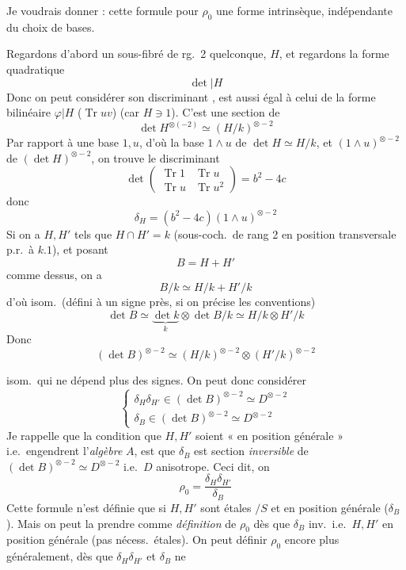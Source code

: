 \documentclass[11pt,a4paper]{article}
\begin{document}
Je voudrais donner : cette formule pour $\rho_{0}$ une forme intrinsèque, indépendante du choix de bases.

Regardons d'abord un sous-fibré  de rg.\ 2 quelconque, $H$, et regardons \struck{\ill{}} la forme  quadratique
\[
\det|H
\]
Donc on peut considérer son discriminant , est aussi égal à celui de la forme bilinéaire  $\varphi|H$ ($\operatorname{Tr}uv$) (car $H\ni 1$). C'est une section de
\[
\det H^{\otimes(-2)}\simeq (H/k)^{\otimes -2}
\]
Par rapport à une base $1,u$, d'où la base $1\wedge u$ de $\det H\simeq H/k$, et $(1\wedge u)^{\otimes -2}$ de $(\det H)^{\otimes -2}$, on trouve le discriminant
\[
\det\begin{pmatrix}\operatorname{Tr}1&\operatorname{Tr}u\\ \operatorname{Tr}u&\operatorname{Tr}u^{2}\end{pmatrix}=b^{2}-4c
\]
donc
\[
\delta_{H}=(b^{2}-4c)(1\wedge u)^{\otimes -2}
\]
Si on a $H,H'$ tels que $H\cap H'=k$ (sous-coch.\ de rang 2 en position transversale p.r.\ à $k.1$), et posant
\[
B=H+H'
\]
comme dessus, on a
\[
B/k\simeq H/k+H'/k
\]
d'où isom.\ (défini à un signe près, si on précise les conventions)
\[
\det B\simeq \underbrace{\det k}_{k}\otimes\det B/k\simeq H/k\otimes H'/k
\]
Donc \struck{\ill{}}
\[
(\det B)^{\otimes -2}\simeq (H/k)^{\otimes -2}\otimes(H'/k)^{\otimes -2}
\]

isom.\ qui ne dépend plus des signes.  On peut donc considérer
\[
\begin{cases}
\delta_{H}\delta_{H'}\in(\det B)^{\otimes -2}\simeq D^{\otimes -2}\\
\delta_{B}\in(\det B)^{\otimes -2}\simeq D^{\otimes -2}
\end{cases}
\]
Je rappelle que la \struck{\ill{}} condition que \struck{\ill{}} $H,H'$ soient « en position générale » i.e.\ engendrent l'\emph{algèbre} $A$, est que $\delta_{B}$ est section \emph{inversible} de $(\det B)^{\otimes -2}\simeq D^{\otimes -2}$ i.e.\ $D$ anisotrope. Ceci dit, on
\[
\boxed{\rho_{0}=\frac{\delta_{H}\delta_{H'}}{\delta_{B}}}
\]
Cette formule n'est définie que si $H,H'$ sont étales $/S$ et en position générale ($\delta_{B}$ ). Mais on peut la prendre comme \emph{définition} de $\rho_{0}$ dès que $\delta_{B}$ inv.\ i.e.\ $H,H'$ en position générale (pas nécess.\ étales). On peut définir $\rho_{0}$ encore plus généralement, dès que $\delta_{H}\delta_{H'}$ et $\delta_{B}$ ne
\end{document}
